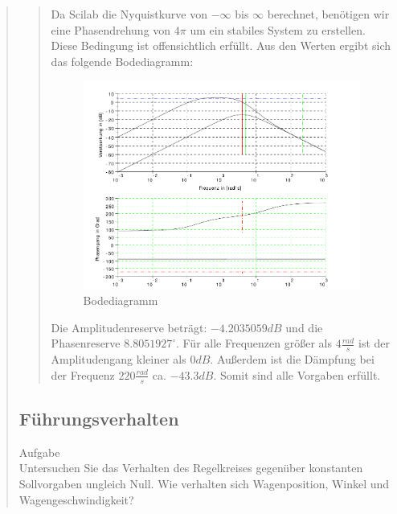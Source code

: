 \begin{quote}
\begin{quote}
        Da Scilab die Nyquistkurve von $-\infty$ bis $\infty$ berechnet, benötigen wir eine Phasendrehung von $4\pi$ um ein
        stabiles System zu erstellen. Diese Bedingung ist offensichtlich erfüllt.\vspace{1em}
        Aus den Werten ergibt sich das folgende Bodediagramm:
        
        \begin{figure}[H]
        \centering
            \includegraphics[scale=0.7, trim = 0cm 0cm 0cm 0cm, clip]{./Bilder/Bodediagramm}
                \caption{Bodediagramm}
        \end{figure}
        
        Die Amplitudenreserve beträgt: $-4.2035059 dB$ und die Phasenreserve $8.8051927 ^{\circ}$. Für alle Frequenzen
        größer als $4\frac{rad}{s}$ ist der Amplitudengang kleiner als $0dB$. Außerdem ist die Dämpfung bei der Frequenz
        $220 \frac{rad}{s}$ ca. $-43.3 dB$. Somit sind alle Vorgaben erfüllt. 
    
    \end{quote}  %
    
    \subsection{Führungsverhalten}
    \label{sec:Fuehrungsverhalten}
    
    Aufgabe\\
    Untersuchen Sie das Verhalten des Regelkreises gegenüber konstanten Sollvorgaben ungleich Null. Wie verhalten sich
    Wagenposition, Winkel und Wagengeschwindigkeit?
    

\end{quote}
